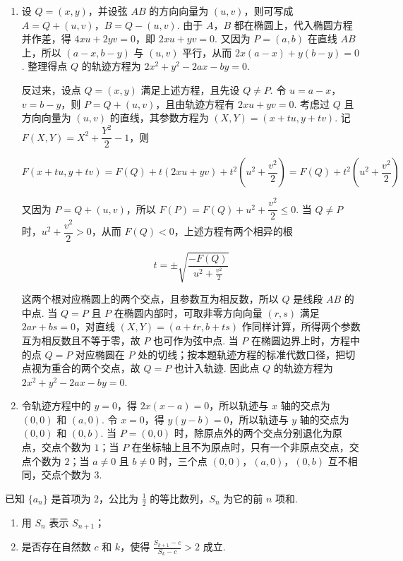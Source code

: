 \begin{solution}
\begin{enumerate}
\item 设 \(Q=(x,y)\)，并设弦 \(AB\) 的方向向量为 \((u,v)\)，则可写成 \(A=Q+(u,v)\)，\(B=Q-(u,v)\). 由于 \(A\)，\(B\) 都在椭圆上，代入椭圆方程并作差，得 \(4xu+2yv=0\)，即 \(2xu+yv=0\). 又因为 \(P=(a,b)\) 在直线 \(AB\) 上，所以 \((a-x,b-y)\) 与 \((u,v)\) 平行，从而 \(2x(a-x)+y(b-y)=0\). 整理得点 \(Q\) 的轨迹方程为 \(2x^{2}+y^{2}-2ax-by=0\).

反过来，设点 \(Q=(x,y)\) 满足上述方程，且先设 \(Q\ne P\). 令 \(u=a-x\)，\(v=b-y\)，则 \(P=Q+(u,v)\)，且由轨迹方程有 \(2xu+yv=0\). 考虑过 \(Q\) 且方向向量为 \((u,v)\) 的直线，其参数方程为 \((X,Y)=(x+tu,y+tv)\). 记 \(F(X,Y)=X^{2}+\dfrac{Y^{2}}{2}-1\)，则

\[
F(x+tu,y+tv)=F(Q)+t(2xu+yv)+t^{2}\left(u^{2}+\frac{v^{2}}{2}\right)=F(Q)+t^{2}\left(u^{2}+\frac{v^{2}}{2}\right)
\]

又因为 \(P=Q+(u,v)\)，所以 \(F(P)=F(Q)+u^{2}+\dfrac{v^{2}}{2}\leqslant0\). 当 \(Q\ne P\) 时，\(u^{2}+\dfrac{v^{2}}{2}>0\)，从而 \(F(Q)<0\)，上述方程有两个相异的根

\[
t=\pm\sqrt{\frac{-F(Q)}{u^{2}+\frac{v^{2}}{2}}}
\]

这两个根对应椭圆上的两个交点，且参数互为相反数，所以 \(Q\) 是线段 \(AB\) 的中点. 当 \(Q=P\) 且 \(P\) 在椭圆内部时，可取非零方向向量 \((r,s)\) 满足 \(2ar+bs=0\)，对直线 \((X,Y)=(a+tr,b+ts)\) 作同样计算，所得两个参数互为相反数且不等于零，故 \(P\) 也可作为弦中点. 当 \(P\) 在椭圆边界上时，方程中的点 \(Q=P\) 对应椭圆在 \(P\) 处的切线；按本题轨迹方程的标准代数口径，把切点视为重合的两个交点，故 \(Q=P\) 也计入轨迹. 因此点 \(Q\) 的轨迹方程为 \(2x^{2}+y^{2}-2ax-by=0\).

\item 令轨迹方程中的 \(y=0\)，得 \(2x(x-a)=0\)，所以轨迹与 \(x\) 轴的交点为 \((0,0)\) 和 \((a,0)\). 令 \(x=0\)，得 \(y(y-b)=0\)，所以轨迹与 \(y\) 轴的交点为 \((0,0)\) 和 \((0,b)\). 当 \(P=(0,0)\) 时，除原点外的两个交点分别退化为原点，交点个数为 \(1\)；当 \(P\) 在坐标轴上且不为原点时，只有一个非原点交点，交点个数为 \(2\)；当 \(a\ne0\) 且 \(b\ne0\) 时，三个点 \((0,0)\)，\((a,0)\)，\((0,b)\) 互不相同，交点个数为 \(3\).
\end{enumerate}
\end{solution}

\begin{problem}
已知 \(\{a_n\}\) 是首项为 \(2\)，公比为 \(\frac{1}{2}\) 的等比数列，\(S_n\) 为它的前 \(n\) 项和.

\begin{enumerate}
\item 用 \(S_n\) 表示 \(S_{n+1}\)；
\item 是否存在自然数 \(c\) 和 \(k\)，使得 \(\frac{S_{k+1}-c}{S_k-c}>2\) 成立.
\end{enumerate}
\end{problem}

